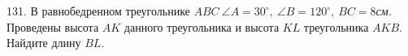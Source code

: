 131. В равнобедренном треугольнике $ABC\ \angle A=30^\circ,\ \angle B=120^\circ,\ BC=8${\it см.} Проведены высота $AK$ данного треугольника и высота $KL$ треугольника $AKB.$ Найдите длину $BL.$\\
